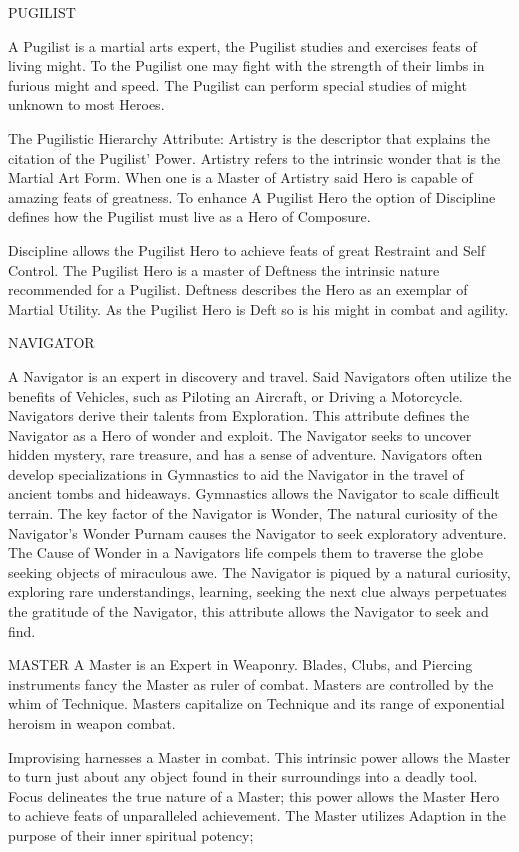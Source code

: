 \documentclass{article}
\begin{document}
PUGILIST

	A Pugilist is a martial arts expert, the Pugilist studies and exercises feats of living might. To the
Pugilist one may fight with the strength of their limbs in furious might and speed. The Pugilist
can perform special studies of might unknown to most Heroes.

	The Pugilistic Hierarchy Attribute: Artistry is the descriptor that explains the citation of the
Pugilist’ Power. Artistry refers to the intrinsic wonder that is the Martial Art Form.
When one is a Master of Artistry said Hero is capable of amazing feats of greatness. To enhance
A Pugilist Hero the option of Discipline defines how the Pugilist must live as a Hero of
Composure.

	Discipline allows the Pugilist Hero to achieve feats of great Restraint and Self Control. The
Pugilist Hero is a master of Deftness the intrinsic nature recommended for a Pugilist. Deftness
describes the Hero as an exemplar of Martial Utility. As the Pugilist Hero is Deft so is his might
in combat and agility.

NAVIGATOR

	A Navigator is an expert in discovery and travel. Said Navigators often utilize the benefits of
Vehicles, such as Piloting an Aircraft, or Driving a Motorcycle. Navigators derive their talents
from Exploration. This attribute defines the Navigator as a Hero of wonder and exploit. The
Navigator seeks to uncover hidden mystery, rare treasure, and has a sense of adventure.
Navigators often develop specializations in Gymnastics to aid the Navigator in the travel of
ancient tombs and hideaways. Gymnastics allows the Navigator to scale difficult terrain.
The key factor of the Navigator is Wonder, The natural curiosity of the Navigator’s Wonder
Purnam causes the Navigator to seek exploratory adventure. The Cause of Wonder in a
Navigators life compels them to traverse the globe seeking objects of miraculous awe. The
Navigator is piqued by a natural curiosity, exploring rare understandings, learning, seeking the
next clue always perpetuates the gratitude of the Navigator, this attribute allows the Navigator to
seek and find.

MASTER
	A Master is an Expert in Weaponry. Blades, Clubs, and Piercing instruments fancy the Master as
ruler of combat. Masters are controlled by the whim of Technique. Masters capitalize on
Technique and its range of exponential heroism in weapon combat.

	Improvising harnesses a Master in combat. This intrinsic power allows the Master to turn just
about any object found in their surroundings into a deadly tool. Focus delineates the true nature
of a Master; this power allows the Master Hero to achieve feats of unparalleled achievement. The
Master utilizes Adaption in the purpose of their inner spiritual potency;
	
\end{document}
